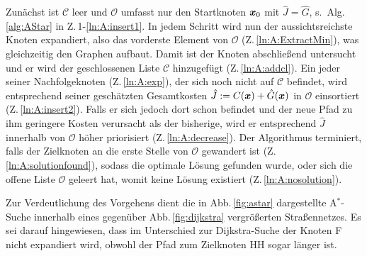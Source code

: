 Zunächst ist $\mathcal C$ leer und $\mathcal O$ umfasst nur den Startknoten $\boldsymbol{x}_0$ mit $\hat J  = \hat G$, s.\ Alg.\,\ref{alg:AStar} in Z.\,1-\ref{ln:A:insert1}. In jedem Schritt wird nun der aussichtsreichste Knoten expandiert, also das vorderste Element von $\mathcal O$  (Z.\,\ref{ln:A:ExtractMin}), was gleichzeitig den Graphen aufbaut. Damit ist der Knoten abschließend untersucht und er wird der geschlossenen Liste $\mathcal C$ hinzugefügt (Z.\,\ref{ln:A:addcl}). Ein jeder seiner Nachfolgeknoten  (Z.\,\ref{ln:A:exp}), der sich noch nicht auf $\mathcal C$ befindet, wird entsprechend seiner geschätzten Gesamtkosten $\hat J := C(\boldsymbol{x}) + \hat G(\boldsymbol{x})$ in $\mathcal O$ einsortiert  (Z.\,\ref{ln:A:insert2}). Falls er sich jedoch dort schon befindet und der neue Pfad zu ihm geringere Kosten verursacht als der bisherige, wird er entsprechend $\hat J $ innerhalb von $\mathcal O$ höher priorisiert  (Z.\,\ref{ln:A:decrease}).  Der Algorithmus terminiert, falls der Zielknoten an die erste Stelle von $\mathcal O$ gewandert ist (Z.\,\ref{ln:A:solutionfound}), sodass die optimale Lösung gefunden wurde, oder sich die offene Liste $\mathcal O$ geleert hat, womit keine Lösung existiert  (Z.\,\ref{ln:A:nosolution}).

Zur Verdeutlichung des Vorgehens dient die in Abb.\,\ref{fig:astar}  dargestellte A$^\ast$-Suche innerhalb eines gegenüber Abb.\,\ref{fig:dijkstra} vergrößerten Straßennetzes. Es sei darauf hingewiesen, dass im Unterschied zur Dijkstra-Suche der Knoten F nicht expandiert wird, obwohl der Pfad zum Zielknoten HH sogar länger ist.

